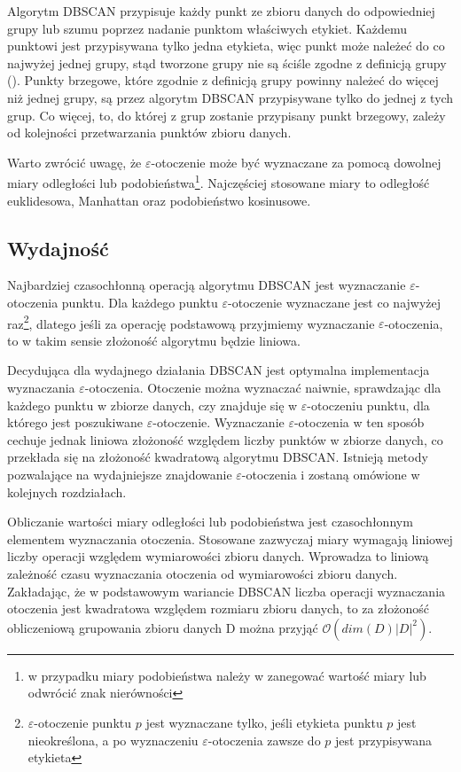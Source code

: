 Algorytm DBSCAN przypisuje każdy punkt ze zbioru danych do odpowiedniej grupy lub szumu poprzez nadanie punktom właściwych etykiet. Każdemu punktowi jest przypisywana tylko jedna etykieta, więc punkt może należeć do co najwyżej jednej grupy, stąd tworzone grupy nie są ściśle zgodne z definicją grupy (). Punkty brzegowe, które zgodnie z definicją grupy powinny należeć do więcej niż jednej grupy, są przez algorytm DBSCAN przypisywane tylko do jednej z tych grup. Co więcej, to, do której z grup zostanie przypisany punkt brzegowy, zależy od kolejności przetwarzania punktów zbioru danych.

Warto zwrócić uwagę, że $ \varepsilon $-otoczenie może być wyznaczane za pomocą dowolnej miary odległości lub podobieństwa\footnote{w przypadku miary podobieństwa należy w  zanegować wartość miary lub odwrócić znak nierówności}. Najczęściej stosowane miary to odległość euklidesowa, Manhattan oraz podobieństwo kosinusowe.



\subsection{Wydajność}
Najbardziej czasochłonną operacją algorytmu DBSCAN jest wyznaczanie $ \varepsilon $-otoczenia punktu. Dla każdego punktu $ \varepsilon $-otoczenie wyznaczane jest co najwyżej raz\footnote{$ \varepsilon $-otoczenie punktu $ p $ jest wyznaczane tylko, jeśli etykieta punktu $ p $ jest nieokreślona, a  po wyznaczeniu $ \varepsilon $-otoczenia zawsze do $ p $ jest przypisywana etykieta}, dlatego jeśli za operację podstawową przyjmiemy wyznaczanie $ \varepsilon $-otoczenia, to w takim sensie złożoność algorytmu będzie liniowa.

Decydująca dla wydajnego działania DBSCAN jest optymalna implementacja wyznaczania $ \varepsilon $-otoczenia. Otoczenie można wyznaczać naiwnie, sprawdzając dla każdego punktu w zbiorze danych, czy znajduje się w $ \varepsilon $-otoczeniu punktu, dla którego jest poszukiwane $ \varepsilon $-otoczenie. Wyznaczanie $ \varepsilon $-otoczenia w ten sposób cechuje jednak liniowa złożoność względem liczby punktów w zbiorze danych, co przekłada się na złożoność kwadratową algorytmu DBSCAN. Istnieją metody pozwalające na wydajniejsze znajdowanie $ \varepsilon $-otoczenia i zostaną omówione w kolejnych rozdziałach.

Obliczanie wartości miary odległości lub podobieństwa jest czasochłonnym elementem wyznaczania otoczenia. Stosowane zazwyczaj miary wymagają liniowej liczby operacji względem wymiarowości zbioru danych. Wprowadza to liniową zależność czasu wyznaczania otoczenia od wymiarowości zbioru danych. Zakładając, że w podstawowym wariancie DBSCAN liczba operacji wyznaczania otoczenia jest kwadratowa względem rozmiaru zbioru danych, to za złożoność obliczeniową grupowania zbioru danych D można przyjąć $ \mathcal{O}(dim(D)|D|^2) $.